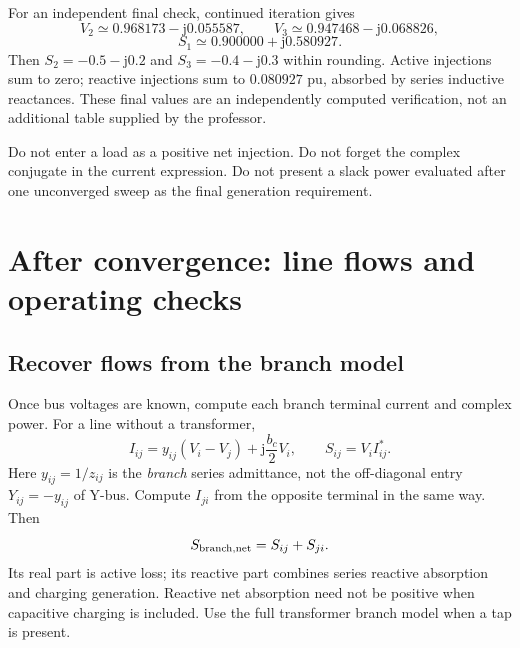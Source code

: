 \documentclass[11pt,a4paper]{article}
\newenvironment{Caution}[1]{\begin{tcolorbox}[colback=warm,colframe=rust,coltitle=white,title={#1}]}{\end{tcolorbox}}
\newcommand{\chapterstart}[2]{\par\needspace{12\baselineskip}\section{#1}\label{#2}}
\newcommand{\jj}{\mathrm j}
\begin{document}
For an independent final check, continued iteration gives
\[
V_2\simeq0.968173-\jj0.055587,\qquad
V_3\simeq0.947468-\jj0.068826,
\]
\[
S_1\simeq0.900000+\jj0.580927.
\]
Then $S_2=-0.5-\jj0.2$ and $S_3=-0.4-\jj0.3$ within rounding. Active injections sum to zero; reactive injections sum to $0.080927$ pu, absorbed by series inductive reactances. These final values are an independently computed verification, not an additional table supplied by the professor.
\begin{Caution}{Three common mistakes in this illustration}
Do not enter a load as a positive net injection. Do not forget the complex conjugate in the current expression. Do not present a slack power evaluated after one unconverged sweep as the final generation requirement.
\end{Caution}

\chapterstart{After convergence: line flows and operating checks}{flows}
\subsection{Recover flows from the branch model}
Once bus voltages are known, compute each branch terminal current and complex power. For a line without a transformer,
\[
I_{ij}=y_{ij}(V_i-V_j)+\jj\frac{b_c}{2}V_i,
\qquad S_{ij}=V_i I_{ij}^*.
\]
Here $y_{ij}=1/z_{ij}$ is the \emph{branch} series admittance, not the off-diagonal entry $Y_{ij}=-y_{ij}$ of Y-bus. Compute $I_{ji}$ from the opposite terminal in the same way. Then
\[
S_{\rm branch,net}=S_{ij}+S_{ji}.
\]
Its real part is active loss; its reactive part combines series reactive absorption and charging generation. Reactive net absorption need not be positive when capacitive charging is included. Use the full transformer branch model when a tap is present.
\end{document}
